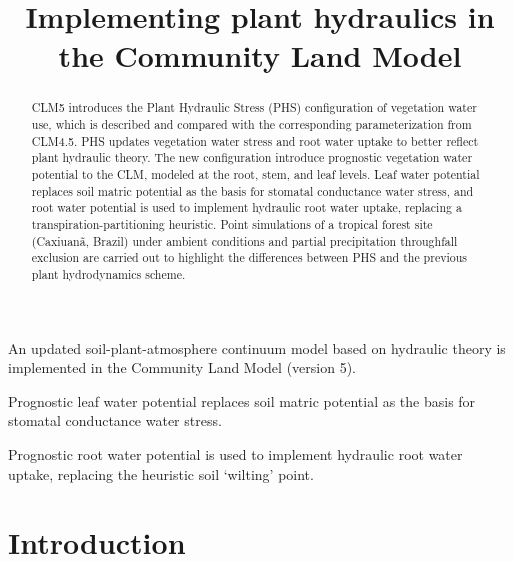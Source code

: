 \documentclass[draft,linenumbers]{agujournal}
\begin{document}
\title{Implementing plant hydraulics in the Community Land Model}



\begin{keypoints}
\item An updated soil-plant-atmosphere continuum model based on hydraulic theory is implemented in the Community Land Model (version 5).
\item Prognostic leaf water potential replaces soil matric potential as the basis for stomatal conductance water stress. 
\item Prognostic root water potential is used to implement hydraulic root water uptake, replacing the heuristic soil `wilting' point.
\end{keypoints}



\begin{abstract}
CLM5 introduces the Plant Hydraulic Stress (PHS) configuration of vegetation water use, which is described and compared with the corresponding parameterization from CLM4.5.
PHS updates vegetation water stress and root water uptake to better reflect plant hydraulic theory.
The new configuration introduce prognostic vegetation water potential to the CLM, modeled at the root, stem, and leaf levels.
Leaf water potential replaces soil matric potential as the basis for stomatal conductance water stress, and
root water potential is used to implement hydraulic root water uptake, replacing a transpiration-partitioning heuristic.
Point simulations of a tropical forest site (Caxiuan\~a, Brazil) under ambient conditions and partial precipitation throughfall exclusion are carried out to highlight the differences between PHS and the previous plant hydrodynamics scheme. 
\end{abstract}


\section{Introduction}
\end{document}
